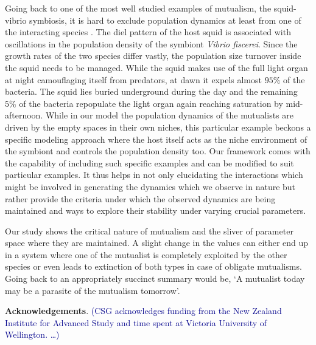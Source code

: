 \documentclass[12pt]{article}
\newcommand{\cha}[1]{\textcolor{darkblue}{(#1)}}
\begin{document}
Going back to one of the most well studied examples of mutualism, the squid-vibrio symbiosis, it is hard to exclude population dynamics at least from one of the interacting species \citep{nyholm:NRM:2004}.
The diel pattern of the host squid is associated with oscillations in the population density of the symbiont \textit{Vibrio fiscerei}.
Since the growth rates of the two species differ vastly, the population size turnover inside the squid needs to be managed.
While the squid makes use of the full light organ at night camouflaging itself from predators, at dawn it expels almost $95\%$ of the bacteria.
The squid lies buried underground during the day and the remaining $5\%$ of the bacteria repopulate the light organ again reaching saturation by mid-afternoon.
While in our model the population dynamics of the mutualists are driven by the empty spaces in their own niches, this particular example beckons a specific modeling approach where the host itself acts as the niche environment of the symbiont and controls the population density too.
Our framework comes with the capability of including such specific examples and can be modified to suit particular examples.
It thus helps in not only elucidating the interactions which might be involved in generating the dynamics which we observe in nature but rather provide the criteria under which the observed dynamics are being maintained and ways to explore their stability under varying crucial parameters. 

Our study shows the critical nature of mutualism and the sliver of parameter space where they are maintained. 
A slight change in the values can either end up in a system where one of the mutualist is completely exploited by the other species or even leads to extinction of both types in case of obligate mutualisms.
Going back to \cite{janzen:bookchapter:1985} an appropriately succinct summary would be,
`A mutualist today may be a parasite of the mutualism tomorrow'.

\textbf{Acknowledgements}. \cha{CSG acknowledges funding from the New Zealand Institute for Advanced Study and time spent at Victoria University of Wellington. \ldots }



%






\renewcommand{\theequation}{A.\arabic{equation}}
\setcounter{equation}{0}

\renewcommand{\thefigure}{A.\arabic{figure}}
\setcounter{figure}{0}
\end{document}
